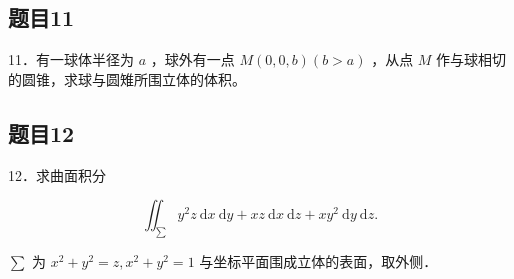 \documentclass{article}
\begin{document}
\subsection{题目11}
11．有一球体半径为 \(a\) ，球外有一点 \(M(0,0, b)(b>a)\) ，从点 \(M\) 作与球相切的圆锥，求球与圆雉所围立体的体积。

\subsection{题目12}
12．求曲面积分

\[
\iint_{\sum} y^{2} z \mathrm{~d} x \mathrm{~d} y+x z \mathrm{~d} x \mathrm{~d} z+x y^{2} \mathrm{~d} y \mathrm{~d} z .
\]

\(\sum\) 为 \(x^{2}+y^{2}=z, x^{2}+y^{2}=1\) 与坐标平面围成立体的表面，取外侧．
\end{document}

